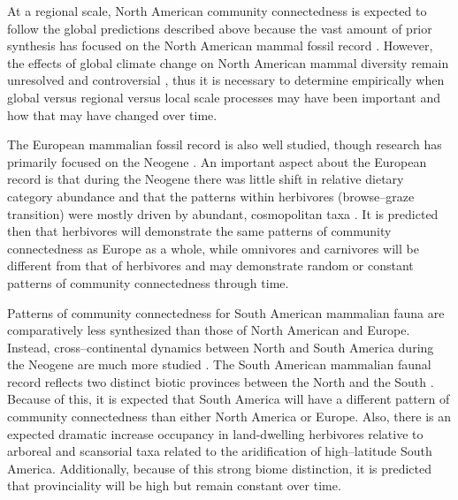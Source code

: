 \documentclass[12pt,letterpaper]{article}
\begin{document}
At a regional scale, North American community connectedness is expected to follow the global predictions described above because the vast amount of prior synthesis has focused on the North American mammal fossil record \citep{Alroy2000g,Alroy1996a,Alroy1998,Barnosky2001a,Simpson1944,Simpson1953,Badgley2013,Blois2009,Figueirido2012,Gunnell1995,Hadly2001}. However, the effects of global climate change on North American mammal diversity remain unresolved and controversial \citep{Alroy2000g,Blois2009,Figueirido2012,Barnosky2001a}, thus it is necessary to determine empirically when global versus regional versus local scale processes may have been important and how that may have changed over time.

The European mammalian fossil record is also well studied, though research has primarily focused on the Neogene \citep{Jernvall2002,Jernvall2004,Liow2008,Raia2006,Raia2005,Raia2011c}. An important aspect about the European record is that during the Neogene there was little shift in relative dietary category abundance \citep{Jernvall2004} and that the patterns within herbivores (browse--graze transition) were mostly driven by abundant, cosmopolitan taxa \citep{Jernvall2002}. It is predicted then that herbivores will demonstrate the same patterns of community connectedness as Europe as a whole, while omnivores and carnivores will be different from that of herbivores and may demonstrate random or constant patterns of community connectedness through time. 

Patterns of community connectedness for South American mammalian fauna are comparatively less synthesized than those of North American and Europe. Instead, cross--continental dynamics between North and South America during the Neogene are much more studied \citep{Marshall1982}. The South American mammalian faunal record reflects two distinct biotic provinces between the North and the South \citep{Macfadden1997,Macfadden2006,Flynn1998a,Patterson1968}. Because of this, it is expected that South America will have a different pattern of community connectedness than either North America or Europe. Also, there is an expected dramatic increase occupancy in land-dwelling herbivores relative to arboreal and scansorial taxa related to the aridification of high--latitude South America. Additionally, because of this strong biome distinction, it is predicted that provinciality will be high but remain constant over time. %
\end{document}
